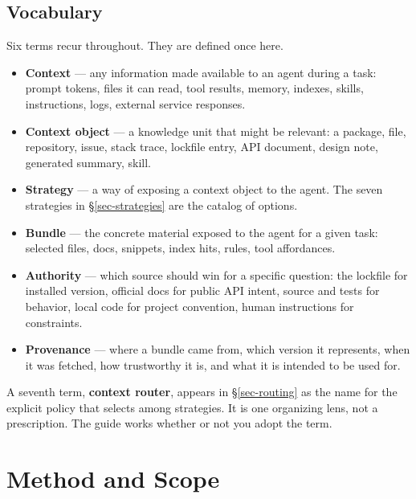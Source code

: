 \documentclass[
  11pt,
  letterpaper,
  numbers=noendperiod,
  parskip=half]{scrartcl}
\begin{document}
\subsection{Vocabulary}\label{sec-vocabulary}

Six terms recur throughout. They are defined once here.

\begin{itemize}
\item
  \textbf{Context} --- any information made available to an agent during
  a task: prompt tokens, files it can read, tool results, memory,
  indexes, skills, instructions, logs, external service responses.
\item
  \textbf{Context object} --- a knowledge unit that might be relevant: a
  package, file, repository, issue, stack trace, lockfile entry, API
  document, design note, generated summary, skill.
\item
  \textbf{Strategy} --- a way of exposing a context object to the agent.
  The seven strategies in \S\ref{sec-strategies} are the catalog of
  options.
\item
  \textbf{Bundle} --- the concrete material exposed to the agent for a
  given task: selected files, docs, snippets, index hits, rules, tool
  affordances.
\item
  \textbf{Authority} --- which source should win for a specific
  question: the lockfile for installed version, official docs for public
  API intent, source and tests for behavior, local code for project
  convention, human instructions for constraints.
\item
  \textbf{Provenance} --- where a bundle came from, which version it
  represents, when it was fetched, how trustworthy it is, and what it
  is intended to be used for.
\end{itemize}

A seventh term, \textbf{context router}, appears in \S\ref{sec-routing}
as the name for the explicit policy that selects among strategies. It
is one organizing lens, not a prescription. The guide works whether or
not you adopt the term.

\iffalse
\section{Method and Scope}\label{sec-method}
\end{document}
